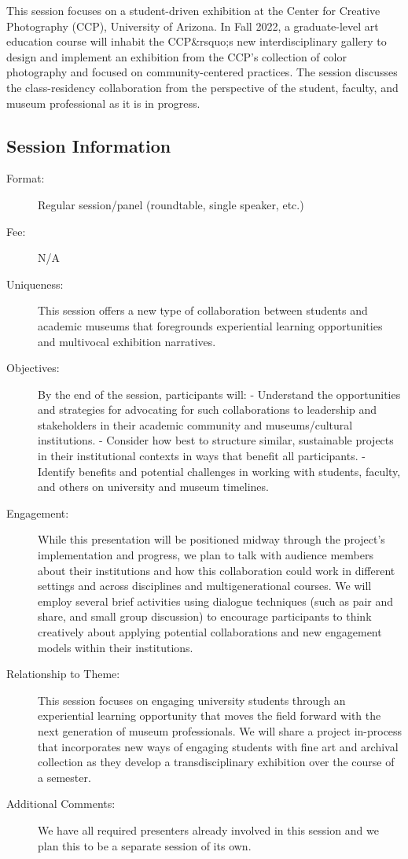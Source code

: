 \documentclass{report}
\begin{document}
              This session focuses on a student-driven exhibition at the Center for Creative Photography (CCP), University of Arizona. In Fall 2022, a graduate-level art education course will inhabit the CCP\&rsquo;s new interdisciplinary gallery to design and implement an exhibition from the CCP’s collection of color photography and focused on community-centered practices. The session discusses the class-residency collaboration from the perspective of the student, faculty, and museum professional as it is in progress.

              \subsection*{Session Information}
                \begin{description}
                  \item [Format:] Regular session/panel (roundtable, single speaker, etc.)
							    
								  \item [Fee:]N/A
							     
							    \item [Uniqueness:]​​This session offers a new type of collaboration between students and academic museums that foregrounds experiential learning opportunities and multivocal exhibition narratives.
							    \item [Objectives:]By the end of the session, participants will:
- Understand the opportunities and strategies for advocating for such collaborations to leadership and stakeholders in their academic community and museums/cultural institutions.
- Consider how best to structure similar, sustainable projects in their institutional contexts in ways that benefit all participants.
- Identify benefits and potential challenges in working with students, faculty, and others on university and museum timelines.
							    \item [Engagement:]While this presentation will be positioned midway through the project’s implementation and progress, we plan to talk with audience members about their institutions and how this collaboration could work in different settings and across disciplines and multigenerational courses. We will employ several brief activities using dialogue techniques (such as pair and share, and small group discussion) to encourage participants to think creatively about applying potential collaborations and new engagement models within their institutions.
							    \item [Relationship to Theme:]This session focuses on engaging university students through an experiential learning opportunity that moves the field forward with the next generation of museum professionals. We will share a project in-process that incorporates new ways of engaging students with fine art and archival collection as they develop a transdisciplinary exhibition over the course of a semester.
							    
                    \item [Additional Comments: ]We have all required presenters already involved in this session and we plan this to be a separate session of its own.  

                \end{description}
\end{document}
